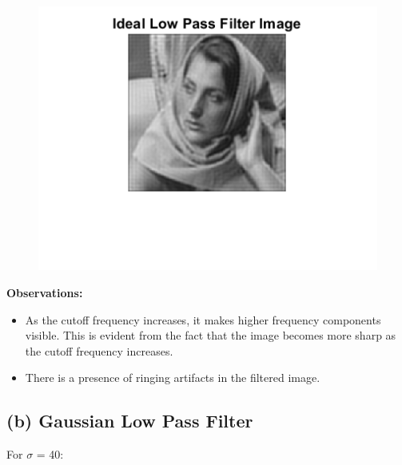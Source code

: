 \documentclass{article}
\begin{document}
\begin{figure}[!htb]
\begin{minipage}[b]{0.3\textwidth}
    \end{minipage}
    \begin{minipage}[b]{0.3\textwidth}
        \includegraphics[width=\textwidth]{Filtered_Image_80.png}
    \end{minipage}
\end{figure}

\newpage
\textbf{Observations:} 
\begin{itemize}[noitemsep]
    \item As the cutoff frequency increases, it makes higher frequency components visible. This is evident from the fact that the image becomes more sharp as the cutoff frequency increases.
    \item There is a presence of ringing artifacts in the filtered image.
\end{itemize}

\subsection*{(b) Gaussian Low Pass Filter}

For $\sigma$ = 40:
\end{document}
